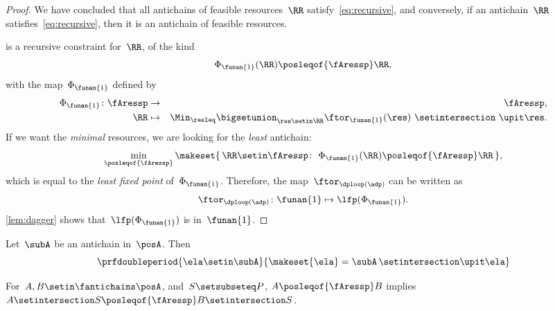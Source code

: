 \begin{proof}
    We have concluded that all antichains of feasible resources~$\RR$ satisfy~\cref{eq:recursive}, and conversely, if an antichain~$\RR$ satisfies~\cref{eq:recursive}, then it is an antichain of feasible resources.

     is a recursive constraint for~$\RR$, of the kind
    \begin{equation}
        \Phi_{\funan{1}}(\RR)\posleqof{\fAressp}\RR,
    \end{equation}
    with the map~$\Phi_{\funan{1}}$ defined by
    \begin{eqnarray}
        \Phi_{\funan{1}}\colon \fAressp & \to     & \fAressp,\label{eq:bigphi} \\
        \RR                             & \mapsto & \Min_{\resleq}\bigsetunion_{\res\setin\RR}\ftor_{\funan{1}}(\res)\ \setintersection\ \upit\res.\nonumber
    \end{eqnarray}
    If we want the \emph{minimal} resources, we are looking for the \emph{least} antichain:
    \begin{equation}
        \min_{\posleqof{\fAressp}}\makeset{\,\RR\setin\fAressp\colon\ \Phi_{\funan{1}}(\RR)\posleqof{\fAressp}\RR\,},
    \end{equation}
    which is equal to the \emph{least fixed point }of~$\Phi_{\funan{1}}$.
    Therefore, the map~$\ftor_{\dploop(\adp)}$ can be written as
    \begin{equation}
        \ftor_{\dploop(\adp)}\colon\funan{1}\mapsto\lfp(\Phi_{\funan{1}}).
        \label{eq:loop_fixpoint}
    \end{equation}
    \cref{lem:dagger} shows that~$\lfp(\Phi_{\funan{1}})$ is \scottcontinuous in~$\funan{1}$.
\end{proof}
\begin{lemma}
    \label{lem:antichain-write}
    Let~$\subA$ be an antichain in~$\posA$.
    Then
    \begin{equation}
        \prfdoubleperiod{
            \ela\setin \subA
        }{
            \makeset{\ela}=\subA\,\setintersection\upit \ela
        }
    \end{equation}
\end{lemma}

\begin{lemma}
    \label{lem:antichain_inter}
    For~$A,B\setin\fantichains\posA$, and~$S\setsubseteq P$,
    $A\posleqof{\fAressp}B$ implies $A\setintersection S\posleqof{\fAressp}B\setintersection S$.
\end{lemma}

